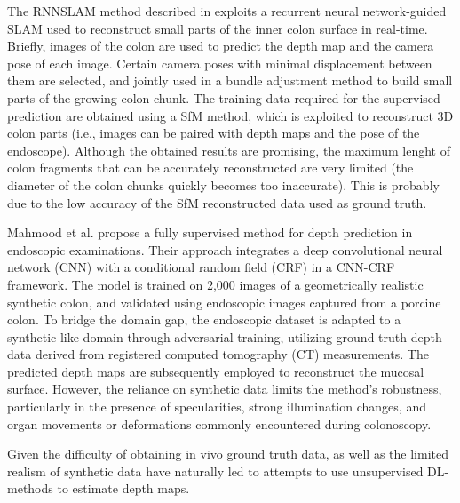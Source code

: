 \documentclass[a4paper,fleqn]{cas-dc}
\begin{document}
The RNNSLAM method described in \citep{Ma_MICCAI_2019, Ma_MIA_2021} exploits a recurrent neural network-guided SLAM used to reconstruct small parts of the inner colon surface in real-time. Briefly, images of the colon are used to predict the depth map and the camera pose of each image. Certain camera poses with minimal displacement between them are selected, and jointly used in a bundle adjustment method to build small parts of the growing colon chunk.   
The training data required for the supervised prediction are obtained using a SfM method, which is exploited to reconstruct 3D colon parts (i.e., images can be paired with depth maps and the pose of the endoscope). Although the obtained results are promising, the maximum lenght of colon fragments  that can be accurately reconstructed are very limited  (the diameter of the colon chunks quickly becomes too inaccurate). This is probably due to the low accuracy of the SfM reconstructed data used as ground truth. 

Mahmood et al. \citep{MAHMOOD_MIA_2018} propose a fully supervised method for depth prediction in endoscopic examinations. Their approach integrates a deep convolutional neural network (CNN) with a conditional random field (CRF) in a CNN-CRF framework. The model is trained on 2,000 images of a geometrically realistic synthetic colon, and validated using endoscopic images captured from a porcine colon. To bridge the domain gap, the endoscopic dataset is adapted to a synthetic-like domain through adversarial training, utilizing ground truth depth data derived from registered computed tomography (CT) measurements. The predicted depth maps are subsequently employed to reconstruct the mucosal surface. However, the reliance on synthetic data limits the method’s robustness, particularly in the presence of specularities, strong illumination changes, and organ movements or deformations commonly encountered during colonoscopy. 

Given the difficulty of obtaining in vivo ground truth data, as well as the limited realism of synthetic data have naturally led to attempts to use unsupervised DL-methods to estimate depth maps. 
\end{document}
